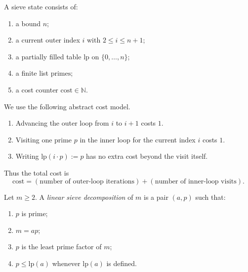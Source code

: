 \begin{definition}
    \label{def:sieve_state}
    A sieve state consists of:
    \begin{enumerate}
        \item a bound $n$;
        \item a current outer index $i$ with $2 \le i \le n+1$;
        \item a partially filled table $\mathrm{lp}$ on $\{0,\dots,n\}$;
        \item a finite list $\mathrm{primes}$;
        \item a cost counter $\mathrm{cost}\in\mathbb{N}$.
    \end{enumerate}
\end{definition}

\begin{definition}
    \label{def:cost_model}
    We use the following abstract cost model.
    \begin{enumerate}
        \item Advancing the outer loop from $i$ to $i+1$ costs $1$.
        \item Visiting one prime $p$ in the inner loop for the current index $i$ costs $1$.
        \item Writing $\mathrm{lp}(i\cdot p):=p$ has no extra cost beyond the visit itself.
    \end{enumerate}
    Thus the total cost is
    \[
        \mathrm{cost}
        =
        (\text{number of outer-loop iterations})
        +
        (\text{number of inner-loop visits}).
    \]
\end{definition}

\begin{definition}
    \label{def:linear_decomp}
    Let $m\ge 2$.
    A \emph{linear sieve decomposition} of $m$ is a pair $(a,p)$ such that:
    \begin{enumerate}
        \item $p$ is prime;
        \item $m = a p$;
        \item $p$ is the least prime factor of $m$;
        \item $p \le \mathrm{lp}(a)$ whenever $\mathrm{lp}(a)$ is defined.
    \end{enumerate}
\end{definition}

